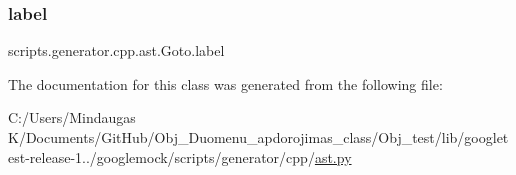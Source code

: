 \subsubsection{\texorpdfstring{label}{label}}
{\footnotesize\ttfamily scripts.\+generator.\+cpp.\+ast.\+Goto.\+label}



The documentation for this class was generated from the following file\+:\begin{DoxyCompactItemize}
\item 
C\+:/\+Users/\+Mindaugas K/\+Documents/\+Git\+Hub/\+Obj\+\_\+\+Duomenu\+\_\+apdorojimas\+\_\+class/\+Obj\+\_\+test/lib/googletest-\/release-\/1../googlemock/scripts/generator/cpp/\mbox{\hyperlink{_obj__test_2lib_2googletest-release-1_88_81_2googlemock_2scripts_2generator_2cpp_2ast_8py}{ast.\+py}}\end{DoxyCompactItemize}
